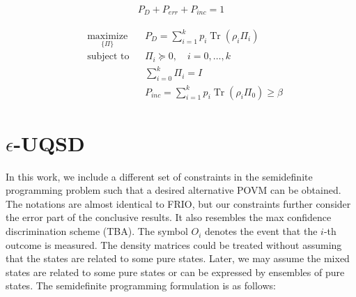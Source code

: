 \documentclass[11pt]{article}
\theoremstyle{definition}
\begin{document}
\begin{align}
    P_{D} + P_{err} + P_{inc} = 1
\end{align}

\begin{align}
     & \underset{\{\Pi\}}{\text{maximize}} &  & P_{D}=\sum_{i=1}^{k} p_{i} \operatorname{Tr}(\rho_{i} \Pi_{i})              \\
     & \text{subject to}                   &  & \Pi_{i} \succeq 0, \quad i = 0, \ldots, k                                   \\
     &                                     &  & \sum_{i=0}^{k} \Pi_i = I                                                    \\
     &                                     &  & P_{inc}=\sum_{i=1}^{k} p_{i} \operatorname{Tr}(\rho_{i} \Pi_{0}) \geq \beta
\end{align}

\section{$\epsilon$-UQSD}
In this work, we include a different set of constraints in the semidefinite programming problem
such that a desired alternative POVM can be obtained.
The notations are almost identical to FRIO, but our constraints further consider the error part of the conclusive results.
It also resembles the max confidence discrimination scheme (TBA).
The symbol $O_{i}$ denotes the event that the $i$-th outcome is measured.
The density matrices could be treated without assuming that the states are related to some pure states.
Later, we may assume the mixed states are related to some pure states or can be expressed by ensembles of pure states.
The semidefinite programming formulation is as follows:
\end{document}
